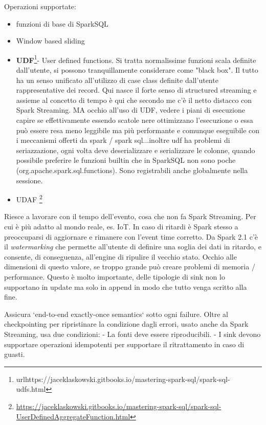 \documentclass[12pt,italian]{article}
\begin{document}
Operazioni supportate:
\begin{itemize}
	\item funzioni di base di SparkSQL 
	\item Window based sliding
	\item \textbf{UDF}\footnote{url{https://jaceklaskowski.gitbooks.io/mastering-spark-sql/spark-sql-udfs.html}}- User defined functions. Si tratta normalissime funzioni scala definite dall'utente, si possono tranquillamente considerare come "black box". Il tutto ha un senso unificato all'utilizzo di case class definite dall'utente rappresentative dei record. Qui nasce il forte senso di structured streaming e assieme al concetto di tempo è qui che secondo
	me c'è il netto distacco con Spark Streaming. MA occhio all'uso di UDF, vedere i piani di esecuzione capire se effettivamente essendo scatole nere ottimizzano l'esecuzione o essa può essere resa meno leggibile ma più performante e comunque eseguibile con i meccanismi offerti da spark / spark sql...inoltre udf ha problemi di seriazzazione, ogni volta deve deserializzare e serializzare le colonne, quando possibile preferire le funzioni builtin che in SparkSQL non sono poche (org.apache.spark.sql.functions). Sono registrabili anche globalmente nella sessione. %
	\item UDAF \footnote{\url{https://jaceklaskowski.gitbooks.io/mastering-spark-sql/spark-sql-UserDefinedAggregateFunction.html}} %
\end{itemize}

Riesce a lavorare con il tempo dell'evento, cosa che non fa Spark Streaming.
Per cui è più adatto al mondo reale, es. IoT.
In caso di ritardi è Spark stesso a preoccuparsi di aggiornare e rimanere con l'event time corretto.
Da Spark 2.1 c'è il \textit{watermarking} che permette all'utente di definire una soglia dei dati in ritardo, e consente, di conseguenza, all'engine di ripulire il vecchio stato.
Occhio alle dimensioni di questo valore, se troppo grande può creare problemi di memoria / performance. Questo è molto importante, delle tipologie di sink non lo supportano in update ma solo in append in modo  che tutto venga scritto alla fine.

Assicura `end-to-end exactly-once semantics` sotto ogni failure.
Oltre al checkpointing per ripristinare la condizione dagli errori, usato anche da Spark Streaming, usa due condizioni:
- La fonti deve essere riproducibili.
- I sink devono supportare operazioni idempotenti per supportare il ritrattamento in caso di guasti.
\end{document}
